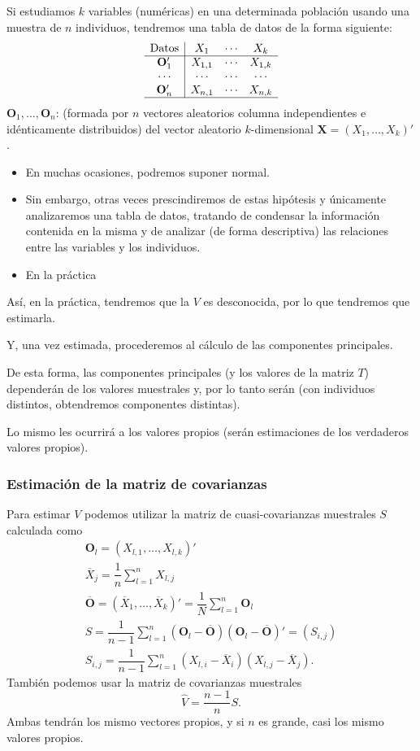 Si estudiamos $k$ variables (numéricas) en una determinada población usando una muestra de $n$ individuos, tendremos una tabla de datos de la forma siguiente: \[ \begin{array}{c|ccc}
	\text{Datos} & X_1 & \cdots& X_k\\ \hline
	\mathbf{O}_1' & X_{1,1} & \cdots & X_{1,k}\\
	\cdots& \cdots&\cdots & \cdots\\
	\mathbf{O}_n' & X_{n,1} & \cdots & X_{n,k}\\ \hline
\end{array} \]
$\mathbf{O}_1,\dots,\mathbf{O}_n$: \mas (formada por $n$ vectores aleatorios columna independientes e idénticamente distribuidos) del vector aleatorio $k$-dimensional $\mathbf{X}=(X_1,\dots,X_k)'$. 
\begin{itemize}
	\item En muchas ocasiones, podremos suponer normal.
	\item Sin embargo, otras veces prescindiremos de estas hipótesis y únicamente analizaremos una tabla de datos, tratando de condensar la información contenida en la misma y de analizar (de forma descriptiva) las relaciones entre las variables y los individuos.
\end{itemize}
\begin{itemize}[label=\color{red}\textbullet, leftmargin=*]
	\item \color{lightblue}En la práctica
\end{itemize}
Así, en la práctica, tendremos que la  $V$ es desconocida, por lo que tendremos que estimarla.

Y, una vez estimada, procederemos al cálculo de las componentes principales.

De esta forma, las componentes principales (y los valores de la matriz $T$) dependerán de los valores muestrales y, por lo tanto serán \veas (con individuos distintos, obtendremos componentes distintas).

Lo mismo les ocurrirá a los valores propios (serán estimaciones de los verdaderos valores propios).
\subsubsection{Estimación de la matriz de covarianzas}
Para estimar $V$ podemos utilizar la matriz de cuasi-covarianzas muestrales $S$ calculada como \[ \begin{array}{l}
	\mathbf{O}_l=(X_{l,1},\dots,X_{l,k})'\\
	\overline{X}_j=\dfrac{1}{n}\sum_{l=1}^{n}X_{l,j}\\
	\overline{\mathbf{O}}=(\overline{X}_1,\dots,\overline{X}_k)'=\dfrac{1}{N}\sum_{l=1}^{n}\mathbf{O}_l\\
	S=\dfrac{1}{n-1}\sum_{l=1}^{n}(\mathbf{O}_l-\overline{\mathbf{O}})(\mathbf{O}_l-\overline{\mathbf{O}})'=(S_{i,j})\\
	S_{i,j}=\dfrac{1}{n-1}\sum_{l=1}^{n}(X_{l,i}-\overline{X}_i)(X_{l,j}-\overline{X}_j).
\end{array} \]
También podemos usar la matriz de covarianzas muestrales \[ \hat{V}=\dfrac{n-1}{n}S. \]
Ambas tendrán los mismo vectores propios, y si $n$ es grande, casi los mismo valores propios.

